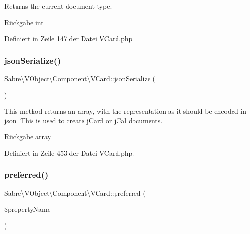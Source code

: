 Returns the current document type.

\begin{DoxyReturn}{Rückgabe}
int 
\end{DoxyReturn}


Definiert in Zeile 147 der Datei V\+Card.\+php.

\mbox{\label{class_sabre_1_1_v_object_1_1_component_1_1_v_card_a91547a8d1c9824b12f902890fbb05739}} 
\subsubsection{\texorpdfstring{json\+Serialize()}{jsonSerialize()}}
{\footnotesize\ttfamily Sabre\textbackslash{}\+V\+Object\textbackslash{}\+Component\textbackslash{}\+V\+Card\+::json\+Serialize (\begin{DoxyParamCaption}{ }\end{DoxyParamCaption})}

This method returns an array, with the representation as it should be encoded in json. This is used to create j\+Card or j\+Cal documents.

\begin{DoxyReturn}{Rückgabe}
array 
\end{DoxyReturn}


Definiert in Zeile 453 der Datei V\+Card.\+php.

\mbox{\label{class_sabre_1_1_v_object_1_1_component_1_1_v_card_a3edf6cf7e9b9c94fb4384a6a61581a47}} 
\subsubsection{\texorpdfstring{preferred()}{preferred()}}
{\footnotesize\ttfamily Sabre\textbackslash{}\+V\+Object\textbackslash{}\+Component\textbackslash{}\+V\+Card\+::preferred (\begin{DoxyParamCaption}\item[{}]{\$property\+Name }\end{DoxyParamCaption})}

